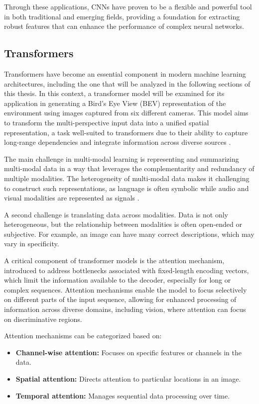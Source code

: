 Through these applications, CNNs have proven to be a flexible and powerful tool in both traditional and emerging fields, providing a foundation for extracting robust features that can enhance the performance of complex neural networks.

\subsection{Transformers}
Transformers have become an essential component in modern machine learning architectures, including the one that will be analyzed in the following sections of this thesis. In this context, a transformer model will be examined for its application in generating a Bird's Eye View (BEV) representation of the environment using images captured from six different cameras. This model aims to transform the multi-perspective input data into a unified spatial representation, a task well-suited to transformers due to their ability to capture long-range dependencies and integrate information across diverse sources \cite{DBLP:journals/corr/VaswaniSPUJGKP17}.

The main challenge in multi-modal learning is representing and summarizing multi-modal data in a way that leverages the complementarity and redundancy of multiple modalities. The heterogeneity of multi-modal data makes it challenging to construct such representations, as language is often symbolic while audio and visual modalities are represented as signals \cite{DBLP:journals/corr/BaltrusaitisAM17}.

A second challenge is translating data across modalities. Data is not only heterogeneous, but the relationship between modalities is often open-ended or subjective. For example, an image can have many correct descriptions, which may vary in specificity.

A critical component of transformer models is the attention mechanism, introduced to address bottlenecks associated with fixed-length encoding vectors, which limit the information available to the decoder, especially for long or complex sequences. Attention mechanisms enable the model to focus selectively on different parts of the input sequence, allowing for enhanced processing of information across diverse domains, including vision, where attention can focus on discriminative regions.

Attention mechanisms can be categorized based on:
\begin{itemize}
    \item \textbf{Channel-wise attention:} Focuses on specific features or channels in the data.
    \item \textbf{Spatial attention:} Directs attention to particular locations in an image.
    \item \textbf{Temporal attention:} Manages sequential data processing over time.
\end{itemize}

